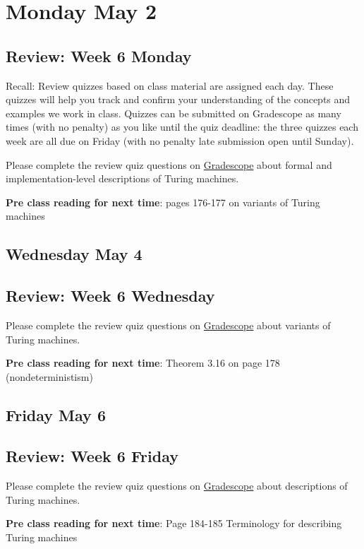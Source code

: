 

\section*{Monday May 2}


    
\newpage
\subsection*{Review: Week 6 Monday}


Recall: Review quizzes based on class material are assigned each day. 
These quizzes will help you track and confirm your understanding of the concepts and examples 
we work in class. Quizzes can be submitted on Gradescope as many times (with no penalty) as 
you like until the quiz deadline: the three quizzes each week are all due on Friday (with no penalty 
late submission open until Sunday).

Please complete the review quiz questions on \href{http://gradescope.com}{Gradescope} about 
formal and implementation-level descriptions of Turing machines.

{\bf Pre class reading for next time}: pages 176-177 on variants of Turing machines


\newpage
\subsection*{Wednesday May 4}



\newpage
\subsection*{Review: Week 6 Wednesday}

Please complete the review quiz questions on \href{http://gradescope.com}{Gradescope} about 
variants of Turing machines.

{\bf Pre class reading for next time}: Theorem 3.16 on page 178 (nondeterministism)



\newpage
\subsection*{Friday May 6}



\newpage
\subsection*{Review: Week 6 Friday}


Please complete the review quiz questions on \href{http://gradescope.com}{Gradescope} about 
descriptions of Turing machines.

{\bf Pre class reading for next time}: Page 184-185 Terminology for describing Turing machines


